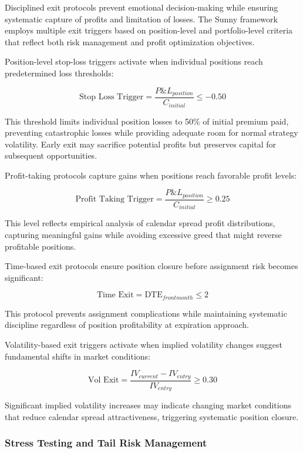 \documentclass[
  american,
  11pt,
  11pt,
  letterpaper,
  onecolumn]{article}
\begin{document}
Disciplined exit protocols prevent emotional decision-making while
ensuring systematic capture of profits and limitation of losses. The
Sunny framework employs multiple exit triggers based on position-level
and portfolio-level criteria that reflect both risk management and
profit optimization objectives.

Position-level stop-loss triggers activate when individual positions
reach predetermined loss thresholds:

\[\text{Stop Loss Trigger} = \frac{P\&L_{position}}{C_{initial}} \leq -0.50\]

This threshold limits individual position losses to 50\% of initial
premium paid, preventing catastrophic losses while providing adequate
room for normal strategy volatility. Early exit may sacrifice potential
profits but preserves capital for subsequent opportunities.

Profit-taking protocols capture gains when positions reach favorable
profit levels:

\[\text{Profit Taking Trigger} = \frac{P\&L_{position}}{C_{initial}} \geq 0.25\]

This level reflects empirical analysis of calendar spread profit
distributions, capturing meaningful gains while avoiding excessive greed
that might reverse profitable positions.

Time-based exit protocols ensure position closure before assignment risk
becomes significant:

\[\text{Time Exit} = \text{DTE}_{front month} \leq 2\]

This protocol prevents assignment complications while maintaining
systematic discipline regardless of position profitability at expiration
approach.

Volatility-based exit triggers activate when implied volatility changes
suggest fundamental shifts in market conditions:

\[\text{Vol Exit} = \frac{IV_{current} - IV_{entry}}{IV_{entry}} \geq 0.30\]

Significant implied volatility increases may indicate changing market
conditions that reduce calendar spread attractiveness, triggering
systematic position closure.

\subsubsection{Stress Testing and Tail Risk
Management}\label{stress-testing-and-tail-risk-management}
\end{document}
